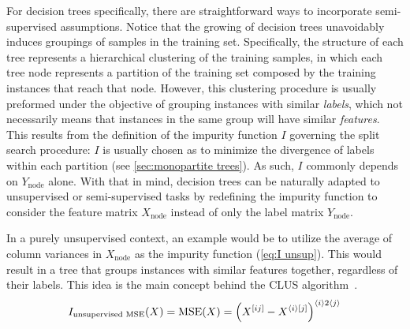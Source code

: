
For decision trees specifically, there are straightforward ways to incorporate semi-supervised assumptions.
%
Notice that the growing of decision trees unavoidably induces groupings of samples in the training set. 
Specifically, the structure of each tree represents a hierarchical clustering of the training samples, in which each tree node represents a partition of the training set composed by the training instances that reach that node.
%
However, this clustering procedure is usually preformed under the objective of grouping instances with similar \emph{labels}, which not necessarily means that instances in the same group will have similar \emph{features}.
%
This results from the definition of the impurity function $I$ governing the split search procedure: $I$ is usually chosen as to minimize the divergence of labels within each partition (see \autoref{sec:monopartite trees}). As such, $I$ commonly depends on $Y_\text{node}$ alone.
%
With that in mind, decision trees can be naturally adapted to unsupervised or semi-supervised tasks by redefining the impurity function to consider the feature matrix $X_\text{node}$ instead of only the label matrix $Y_\text{node}$.

In a purely unsupervised context, an example would be to utilize the average of column variances in $X_\text{node}$ as the impurity function (\autoref{eq:I unsup}). This would result in a tree that groups instances with similar features together, regardless of their labels. This idea is the main concept behind the CLUS algorithm~\cite{boley1998unsupervised}.
%
\begin{equation}
    I_\text{unsupervised MSE}(X) = \text{MSE}(X) = \left( X^{[ij]} - X^{\langle i\rangle[j]} \right)^{\langle i\rangle2\langle j\rangle}
    \label{eq:I unsup}
\end{equation}

